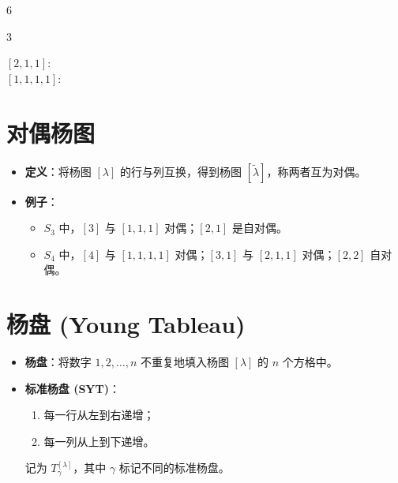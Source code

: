 \documentclass[landscape]{article}
\begin{document}
\begin{multicols*}{6}
\begin{itemize}
\begin{multicols}{3}
        \columnbreak
        
        $[2,1,1]$:  \\
        $[1,1,1,1]$: 
    \end{multicols}
\end{itemize}

\section*{对偶杨图}
\begin{itemize}
    \item \textbf{定义}：将杨图 $[\lambda]$ 的行与列互换，得到杨图 $[\tilde{\lambda}]$，称两者互为对偶。
    \item \textbf{例子}：
    \begin{itemize}
        \item $S_3$ 中，$[3]$ 与 $[1,1,1]$ 对偶；$[2,1]$ 是自对偶。
        \item $S_4$ 中，$[4]$ 与 $[1,1,1,1]$ 对偶；$[3,1]$ 与 $[2,1,1]$ 对偶；$[2,2]$ 自对偶。
    \end{itemize}
\end{itemize}

\section*{杨盘 (Young Tableau)}
\begin{itemize}
    \item \textbf{杨盘}：将数字 $1, 2, \dots, n$ 不重复地填入杨图 $[\lambda]$ 的 $n$ 个方格中。
    \item \textbf{标准杨盘 (SYT)}：
    \begin{enumerate}
        \item 每一行从左到右递增；
        \item 每一列从上到下递增。
    \end{enumerate}
    记为 $T_{\gamma}^{[\lambda]}$，其中 $\gamma$ 标记不同的标准杨盘。
\end{itemize}


\end{multicols*}
\end{document}
